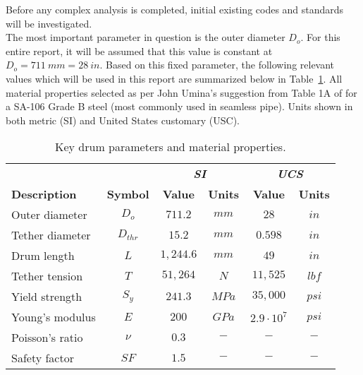 \label{chapt:standards}

Before any complex analysis is completed, initial existing codes and standards will be investigated.\\

The most important parameter in question is the outer diameter $D_o$. For this entire report, it will be assumed that this value is constant at $D_o = 711\ mm = 28\ in$. Based on this fixed parameter, the following relevant values which will be used in this report are summarized below in Table~\ref{table:prelim_params}. All material properties selected as per John Umina's  suggestion from Table 1A of \citep{ASMEbvpcIID} for a SA-106 Grade B steel (most commonly used in seamless pipe). Units shown in both metric (SI) and United States customary (USC).\\

\begin{table}[ht]
	\caption{Key drum parameters and material properties.}
	\centering
    \begin{tabular}{lccccc}
          &       & \multicolumn{2}{c}{\textbf{\textit{SI}}} & \multicolumn{2}{c}{\textbf{\textit{UCS}}} \\
	\textbf{Description} & \textbf{Symbol} & \textbf{Value} & \textbf{Units} & \textbf{Value} & \textbf{Units} \\
    \midrule
    Outer diameter & $D_o$ & $711.2$ & $mm$  & $28$ & $in$ \\
    Tether diameter & $D_{thr}$ & $15.2$ & $mm$  & $0.598$ & $in$ \\
    Drum length & $L$   & $1,244.6$ & $mm$  & $49$ & $in$ \\
    Tether tension & $T$   & $51,264$ & $N$   & $11,525$ & $lbf$ \\
    Yield strength & $S_y$ & $241.3$ & $MPa$ & $35,000$ & $psi$ \\
    Young's modulus & $E$   & $200$ & $GPa$ & $2.9\cdot 10^7$ & $psi$ \\
    Poisson's ratio & $\nu$ & $0.3$ & $-$  & $-$    & $-$ \\
    Safety factor & $SF$ & $1.5$ & $-$  & $-$    & $-$ \\
    \end{tabular}%
  \label{table:prelim_params}
\end{table}

